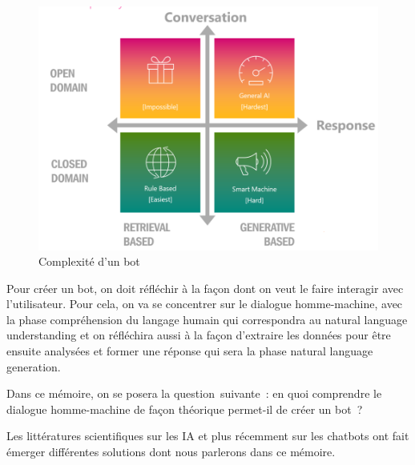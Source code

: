 	\begin{figure}[H]
	\centering
		\includegraphics[width =\textwidth]{complexe.png}
	\caption{Complexité d'un bot}
	\label{fig:Complexité d'un bot}
\end{figure}

Pour créer un bot, on doit réfléchir à la façon dont on veut le faire interagir avec l’utilisateur. Pour cela, on va se concentrer sur le dialogue homme-machine, avec la phase compréhension du langage humain qui correspondra au natural language understanding et on réfléchira aussi à la façon d’extraire les données pour être ensuite analysées  et former une réponse qui sera la phase natural language generation.
\vspace{1em}

	Dans ce mémoire, on se posera la question suivante : en quoi comprendre le dialogue homme-machine de façon théorique permet-il de créer un bot ?
	\vspace{1em}
	
	Les littératures scientifiques sur les IA et plus récemment sur les chatbots ont fait émerger différentes solutions dont  nous parlerons dans ce mémoire.